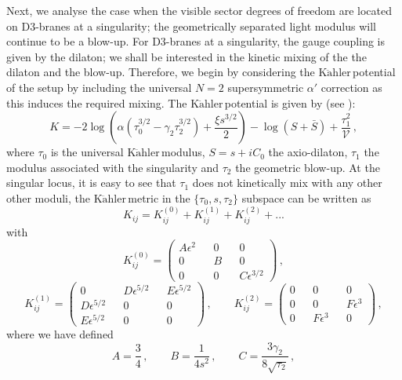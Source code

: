 \documentclass[11pt,a4paper]{article}
\newcommand{\V}{\mathcal{V}}
\newcommand{\Kahler}{\ensuremath{\text{K}\ddot{\text{a}}\text{hler}\,}}
\begin{document}
Next, we analyse the case when the visible sector  degrees of freedom are located on D3-branes at a singularity; the geometrically separated light modulus will continue to be a blow-up. For D3-branes at a singularity, the gauge coupling is given by the dilaton; we shall be interested in the kinetic mixing of the the dilaton and the blow-up. Therefore, we begin by considering the \Kahler potential of the setup by including the universal $N=2$ supersymmetric  $\alpha'$ 
correction \cite{Becker:2002nn} as this induces the required mixing. The \Kahler potential is given by (see \cite{Conlon:2008wa}):
%
\begin{equation}
\label{singuni}
K = - 2 \log\left(\alpha \left(\tau_0^{3/2} - \gamma_2 \tau_2^{3/2}\right) + \frac{\xi s^{3/2}}{2}\right) - \log \left( S + \bar{S}\right) + \frac{\tau_1^2}{\V} \,,
\end{equation}
%
where $\tau_0$ is the universal \Kahler modulus, $S = s + i C_0$ the axio-dilaton, $\tau_1$ the modulus associated with the singularity and $\tau_2$ the geometric blow-up. At the singular locus, it is easy to see that $\tau_1$ does not kinetically mix with any other other moduli, the \Kahler metric in the $\{\tau_0, s, \tau_2\}$ subspace can be written as
%
$$
  K_{ij} =  K_{ij}^{(0)} +  K_{ij}^{(1)}  +  K_{ij}^{(2)}  + . . .
$$
%
with
\begin{equation}
K_{ij}^{(0)} = \begin{pmatrix}
A \epsilon^2 && 0 && 0 \\
0 && B  && 0 \\
0 && 0 && C \epsilon^{3/2}
\end{pmatrix} \,, \nonumber
\end{equation}
\begin{equation}
K_{ij}^{(1)} = \begin{pmatrix}
0 && D \epsilon^{5/2} && E \epsilon^{5/2} \\
D \epsilon^{5/2} && 0 && 0 \\
E \epsilon^{5/2} && 0 && 0 
\end{pmatrix} \,, \qquad K_{ij}^{(2)} = \begin{pmatrix}
0 && 0 && 0 \\
0 && 0 && F \epsilon^3 \\
0 && F \epsilon^3 && 0
\end{pmatrix} \,,
\end{equation}
where we have defined
\begin{equation}
A = \frac{3}{4} \,, \qquad B = \frac{1}{4 s^2} \,, \qquad C =  \frac{3 \gamma_2}{8 \sqrt{\tau_2}} \,, \nonumber
\end{equation}
\end{document}
